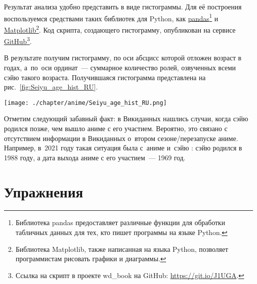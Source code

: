 \newpage
Результат анализа удобно представить в виде гистограммы. 
Для её построения воспользуемся средствами таких библиотек для Python, 
как \href{https://ru.wikipedia.org/wiki/Pandas}{pandas}\footnote[][-\baselineskip]{%
%
    Библиотека pandas предоставляет различные функции для обработки табличных данных 
    для тех, кто пишет программы на языке Python.%
%
} 
и \href{https://ru.wikipedia.org/wiki/Matplotlib}{Matplotlib}\footnote{%
%   
    Библиотека Matplotlib, также написанная на языка Python, 
    позволяет программистам рисовать графики и диаграммы.%
%
}. Код скрипта, создающего гистограмму, 
опубликован на сервисе \href{https://git.io/J1UGA}{GitHub}\footnote{%
    Ссылка на скрипт в проекте wd\_book на GitHub: \href{https://git.io/J1UGA}{https://git.io/J1UGA}.%
}.


В результате получим гистограмму, по оси абсцисс которой отложен возраст в годах, 
а~по~оси ординат~--- суммарное количество ролей, озвученных всеми сэйю такого возраста. Получившаяся гистограмма представлена на рис.~\ref{fig:Seiyu_age_hist_RU}. 

\begin{figure*}[h!]
    \texttt{[image: ./chapter/anime/Seiyu\_age\_hist\_RU.png]}%
	\caption[Гистограмма числа аниме, озвученных сэйю разных возрастов, 2021 года.]{Гистограмма с числом аниме, озвученных сэйю разных возрастов, 2021 год. Гистограмма построена на~основе данных, полученных с помощью запросов~\protect\ref{lst:seiyu_bd_w_service} (или~\protect\ref{lst:seiyu_bd_w_rdfs}), \protect\ref{lst:all_anime_releases} и \protect\ref{lst:link_anime_seiyu}.}%
    \label{fig:Seiyu_age_hist_RU}%
\end{figure*} 


\newpage
Отметим следующий забавный факт: в Викиданных нашлись случаи, когда сэйю родился позже, чем вышло аниме с его участием. Вероятно, это связано с отсутствием информации в Викиданных о~втором сезоне/перезапуске аниме. 
Например, в~2021 году такая ситуация была 
с~аниме  и~сэйю : 
сэйю родился в 1988 году, а дата выхода аниме с его участием~--- 1969 год.

\section{Упражнения}

